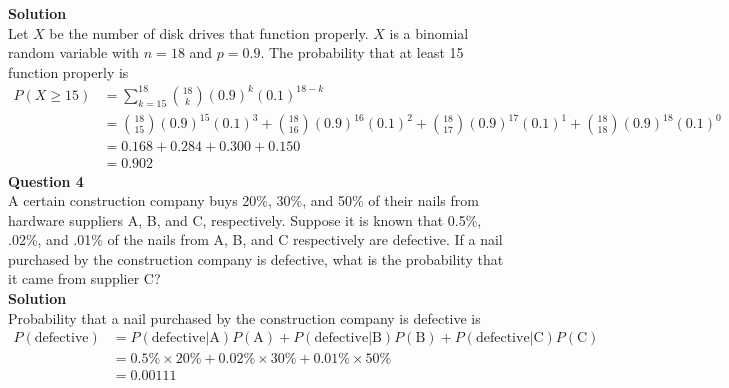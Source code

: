 \documentclass{uofa-eng-assignment}
\begin{document}
\begin{enumerate}
        \textbf{Solution} \\
        Let $X$ be the number of disk drives that function properly. $X$ is a binomial random variable with $n = 18$ and $p = 0.9$. The probability that at least 15 function properly is
        \begin{align*}
            P(X \ge 15) & = \sum_{k=15}^{18} \binom{18}{k} (0.9)^k (0.1)^{18-k}                                                                                                   \\
                        & = \binom{18}{15} (0.9)^{15} (0.1)^{3} + \binom{18}{16} (0.9)^{16} (0.1)^{2} + \binom{18}{17} (0.9)^{17} (0.1)^{1} + \binom{18}{18} (0.9)^{18} (0.1)^{0} \\
                        & = 0.168 + 0.284 + 0.300 + 0.150                                                                                                                         \\
                        & = \boldsymbol{0.902}
        \end{align*}
        \textbf{Question 4} \\
        A certain construction company buys 20\%, 30\%, and 50\% of their nails from hardware suppliers
        A, B, and C, respectively. Suppose it is known that 0.5\%, .02\%, and .01\% of the nails from A, B,
        and C respectively are defective. If a nail purchased by the construction company is defective,
        what is the probability that it came from supplier C? \\
        \textbf{Solution} \\
        Probability that a nail purchased by the construction company is defective is
        \begin{align*}
            P(\text{defective}) & = P(\text{defective} | \text{A}) P(\text{A}) + P(\text{defective} | \text{B}) P(\text{B}) + P(\text{defective} | \text{C}) P(\text{C}) \\
                                & = 0.5\% \times 20\% + 0.02\% \times 30\% + 0.01\% \times 50\%                                                                          \\
                                & = 0.00111                                                                                                                              \\

\end{align*}
\end{enumerate}
\end{document}
